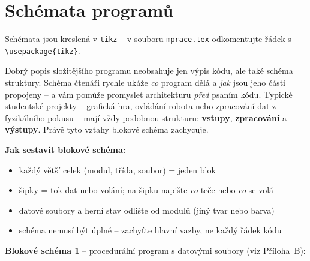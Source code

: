
\section{Schémata programů}

Schémata jsou kreslená v \texttt{tikz} -- v souboru \texttt{mprace.tex}
odkomentujte řádek s \verb|\usepackage{tikz}|.

Dobrý popis složitějšího programu neobsahuje jen výpis kódu, ale také schéma struktury.
Schéma čtenáři rychle ukáže \emph{co} program dělá a \emph{jak} jsou jeho části propojeny
-- a vám pomůže promyslet architekturu \emph{před} psaním kódu.
Typické studentské projekty -- grafická hra, ovládání robota nebo zpracování dat
z fyzikálního pokusu -- mají vždy podobnou strukturu:
\textbf{vstupy}, \textbf{zpracování} a \textbf{výstupy}.
Právě tyto vztahy blokové schéma zachycuje.

\textbf{Jak sestavit blokové schéma:}
\begin{itemize}
	\item každý větší celek (modul, třída, soubor) = jeden blok
	\item šipky = tok dat nebo volání; na šipku napište \emph{co} teče nebo \emph{co} se volá
	\item datové soubory a herní stav odlište od modulů (jiný tvar nebo barva)
	\item schéma nemusí být úplné -- zachyťte hlavní vazby, ne každý řádek kódu
\end{itemize}

\textbf{Blokové schéma 1} -- procedurální program s datovými soubory (viz Příloha~B):

